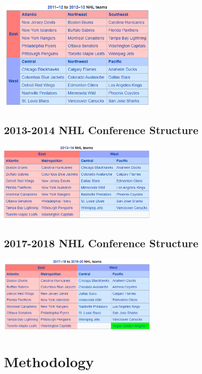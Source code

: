 \documentclass[
]{article}
\begin{document}
\includegraphics[width=0.6\textwidth,height=\textheight]{Images/pre2013struct.png}

\hypertarget{nhl-conference-structure}{%
\subsection{2013-2014 NHL Conference
Structure}\label{nhl-conference-structure}}

\includegraphics[width=0.6\textwidth,height=\textheight]{Images/2013struct.png}

\hypertarget{nhl-conference-structure-1}{%
\subsection{2017-2018 NHL Conference
Structure}\label{nhl-conference-structure-1}}

\includegraphics[width=0.6\textwidth,height=\textheight]{Images/2017struct.png}

\hypertarget{methodology}{%
\section{Methodology}\label{methodology}}
\end{document}
